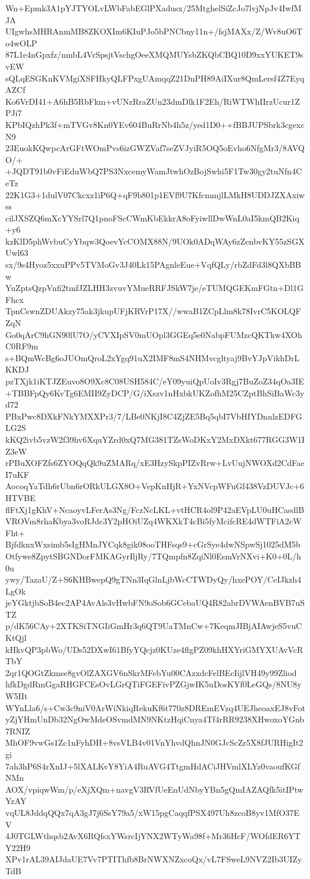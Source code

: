 Wn+Epmk3A1pYJTYOLvLWbFabEGlPXadusx/25MtghelSiZcJo7lvjNpJv4IwfMJA
UIgwhsMHRAnmMB8ZKOXIm6KIuPJo5bPNCbny11n+/fsjMAXx/Z/Wv8uO6To4wOLP
87L1e4nGpxfz/nmbL4VrSpsjtVschgOeeXMQMUYsbZKQbCBQ10D9xxYUKET9svEW
sQLqESGKnKVMgiXSFHkyQLFPxgUAmqqZ21DnPH89AiIXur8QmLersf4Z7EyqAZCf
Ko6VrDI41+A6hB5RbFkm+vUNzRraZUn23dmDlk1F2Eh/RiWTWhIIrzUcur1ZPJi7
KPbIQzhPk3f+mTVGv8Kn0YEv604BuRrNb4h5z/yed1D0++fBBJUPSbrk3cgexcN9
23EuokKQwpcArGFtWOmPvs6izGWZVaf7seZVJyiR5OQ5oEvho6NfgMr3/8AVQO/+
+JQDT91b0vFiEduWbQ7PS3NxcemyWamJtwhOzBojSwhi5F1Tw30gy2tuNfn4CeTz
22K1G3+1dulV07Ckcxz1iP6Q+qF9b801p1EVf9U7KfcmmjlLMkH8UDDJZXAxiwss
cilJXSZQ6mXcYYSrl7Q1pnoFScCWmKbEkkrA8oFyiwllDwWnL0aI5kmQB2Kiq+y6
kzKlD5phWvbuCyYbqw3QoevYcCOMX88N/9UOk0ADqWAy6zZenbvKY55zSGXUwl63
sx/9s4Hyoz5xxuPPv5TVMoGv3J40Lk15PAgnleEue+VqfQLy/rbZdFd3l8QXbBBw
YuZptsQzpVnfi2tmfJZLHH3zvuvYMueRRFJSkW7je/eTUMQGEKmFGtn+Dl1GFhcx
TpnCswnZDUAkzy75ak3jkupUFjKRVrP17X//wwaB1ZCpLlm8k78IvrC5KOLQFZqN
Go0qArC9hGN90lU7O/yCVXIpSV0mUOpl3GGEq5e0NabpFUMzcQKTkw4XOhC0RF9m
s+BQmWcBg6oJUOmQroL2xYgq91uX2IMF8mS4NHMvcgltyaj9BvYJpVikhDrLKKDJ
pzTXjk1iKTJZEuvo8O9Xc8C08USH584C/eY09yuiQpUoIv3Rgj7BuZoZ34qOa3IE
+TBBFpQy6KvTg6EMII9ZyDCP/G/iXszv1nHxbkUKZofhM25CZptBhSiBaWc3yd72
PBxPwc8DXkFNkYMXXPr3/7/LBe0NKjI8C4ZjZE5Bq5qbI7VbHIYDnnlzEDFGLG2S
kKQ2ivb5vzW2f39hv6XquYZrd0xQ7MG381TZsWoDKxY2MxDXkt677RGG3W1IZ3eW
rPBuXOFZfs6ZYOQqQk9uZMARq/xE3HzySkpPIZvRrw+LvUujNWOXd2CdFaeI7uKF
AocoqYaTdh6rUbn6rORkULGX8O+VepKnHjR+YxNVcpWFuGf438VzDUVJc+6HTVBE
flFtXj1gKhV+NcaoyvLFerAs3Ng/FczNcLKL+vtHCR4ol9P42aEVpLU0uHCasdlB
VROVm8rhaKbya3voRJdc3Y2pHOiUZq4WKXkT4cBi5fyMcifcRE4dWTFiA2cWFht+
BjfdknxWxsimb5sIgHMnJYCqk8gik08ooTHFsqs9+cGrSye4dwNSpwSj1025dM5b
Otfywe8ZpytSBGNDorFMKAGyrIljRy/7TQmpfn8ZqiNl0EsmVrNXvi+K0+0L/h0u
ywy/TazaU/Z+S6KHBwepQ9gTNn3IqGlnLjbWcCTWDyQy/hxePOY/CeIJkzh4LgOk
jeYGktjbSoB4ec2AP4AvAls3vHwbFN9oSob6GCebaUQ4R82abrDVWAenBVB7uSTZ
p/dK56CAy+2XTKSiTNGIiGmHr3q6QT9UaTMnCw+7KeqmJIBjAIAwjeS5vuCKtQjl
kHkvQP3pbWo/UDs52DXwI61BfyYQcjz0KUze4flgPZ09khHXYriGMYXUAvVcRTbY
2qr1QOGtZkmse8gvOlZAXGV6nSkrMFebYu00CAzxdcFelBEcIijlVH49y99Zliod
hfkDgdRmGgaRHGFCEsOvLGrQTiFGEFivPZGjwIK5uDosKYf0LeGQs/8NU8yW5IIt
WYnLla6/s+Cw3c9niV0ArWiNkiqRekuKf6t770z8DREmEVzq4UEJheoaxEJ8vFot
yZjYHmUnDb32NgOwMdeOSvmdMN9NKtzHqiCnya4Tf4rRR9238XHwoxoYGnb7RNIZ
MhOF9vwGs1Zc1nFyhDH+8vsVLB4v01VnYhvdQhnJN0GJcScZr5X8fJURHigIt2gi
7ah3hP6S4rXnIJ+5lXALKvY8YiA4RuAVG4TtgmHdACiJHVmlXLYz0vaoufKGfNMn
AOX/vpiqwWm/p/eXjXQm+navgV3RVfUeEnUdNbyYBn5gQmIAZAQfk5itIPtwYzAY
vqUL8JddqQQx7qA3gJ7j6SsY79a5/xW15pgCaqqfPSX497Uh8zcoB8yv1MfO37EV
4J0TGLWthqsb2AvX6RQfsxYWsrcIjYNX2WTyWa98f+Mr36HcF/WOfdER6YTY22H9
XPv1rAL39AIJdaUE7Vv7PTIThfb8BrNWXNZxcoQx/vL7FSweL9NVZ2Ib3UIZyTdB

